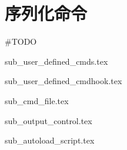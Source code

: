 \section{序列化命令}

\#TODO

{sub_user_defined_cmds.tex}

{sub_user_defined_cmdhook.tex}

{sub_cmd_file.tex}

{sub_output_control.tex}

{sub_autoload_script.tex}
